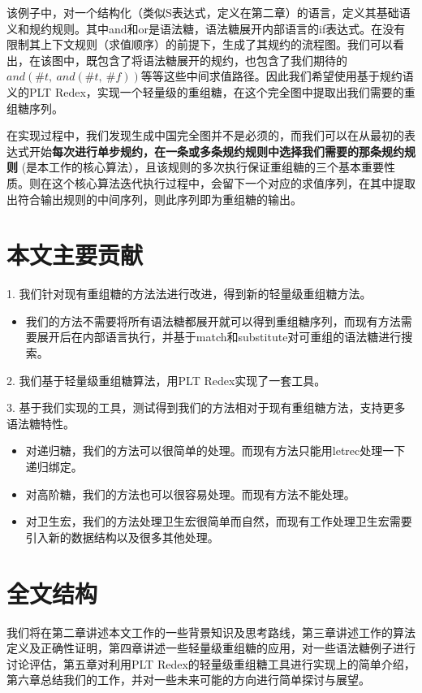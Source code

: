 该例子中，对一个结构化（类似S表达式，定义在第二章）的语言，定义其基础语义和规约规则。其中and和or是语法糖，语法糖展开内部语言的if表达式。在没有限制其上下文规则（求值顺序）的前提下，生成了其规约的流程图。我们可以看出，在该图中，既包含了将语法糖展开的规约，也包含了我们期待的$and(\#t,~and(\#t,~\#f))$等等这些中间求值路径。因此我们希望使用基于规约语义的PLT Redex，实现一个轻量级的重组糖，在这个完全图中提取出我们需要的重组糖序列。

在实现过程中，我们发现生成中国完全图并不是必须的，而我们可以在从最初的表达式开始{\bfseries 每次进行单步规约，在一条或多条规约规则中选择我们需要的那条规约规则 }(是本工作的核心算法），且该规则的多次执行保证重组糖的三个基本重要性质。则在这个核心算法迭代执行过程中，会留下一个对应的求值序列，在其中提取出符合输出规则的中间序列，则此序列即为重组糖的输出。


\section{本文主要贡献}
\begin{flushleft}
	1.	我们针对现有重组糖的方法法进行改进，得到新的轻量级重组糖方法。
\end{flushleft}

\begin{itemize}
	\item 我们的方法不需要将所有语法糖都展开就可以得到重组糖序列，而现有方法需要展开后在内部语言执行，并基于match和substitute对可重组的语法糖进行搜索。
	
\end{itemize}

\begin{flushleft}
	2.	我们基于轻量级重组糖算法，用PLT Redex实现了一套工具。
\end{flushleft}
\begin{flushleft}
	3.	基于我们实现的工具，测试得到我们的方法相对于现有重组糖方法，支持更多语法糖特性。
\end{flushleft}

\begin{itemize}
	\item 对递归糖，我们的方法可以很简单的处理。而现有方法只能用letrec处理一下递归绑定。
	\item 对高阶糖，我们的方法也可以很容易处理。而现有方法不能处理。
	\item 对卫生宏，我们的方法处理卫生宏很简单而自然，而现有工作处理卫生宏需要引入新的数据结构以及很多其他处理。
\end{itemize}

\section{全文结构}

我们将在第二章讲述本文工作的一些背景知识及思考路线，第三章讲述工作的算法定义及正确性证明，第四章讲述一些轻量级重组糖的应用，对一些语法糖例子进行讨论评估，第五章对利用PLT Redex的轻量级重组糖工具进行实现上的简单介绍，第六章总结我们的工作，并对一些未来可能的方向进行简单探讨与展望。
